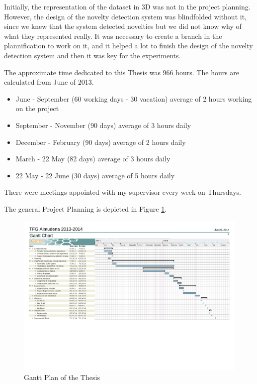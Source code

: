 Initially, the representation of the dataset in 3D was not in the project planning. However, the design of the novelty detection system was blindfolded without it, since we knew that the system detected novelties but we did not know why of what they represented really. It was necessary to create a branch in the plannification to work on it, and it helped a lot to finish the design of the novelty detection system and then it was key for the experiments.    

The approximate time dedicated to this Thesis was 966 hours. The hours are calculated from June of 2013. 

\begin{itemize}
\item June - September (60 working days - 30 vacation) average of 2 hours working on the project
\item September - November (90 days) average of 3 hours daily
\item December - February (90 days) average of 2 hours daily
\item March - 22 May (82 days) average of 3 hours daily
\item 22 May - 22 June (30 days) average of 5 hours daily
\end{itemize}

There were meetings appointed with my supervisor every week on Thursdays.

\begin{landscape}

The general Project Planning is depicted in Figure \ref{Gantt}. 
\begin{figure}[h]
\includegraphics[width=24cm]{Figures/Gantt}
\centering
\caption{Gantt Plan of the Thesis \label{Gantt}}
\end{figure}
\end{landscape}

